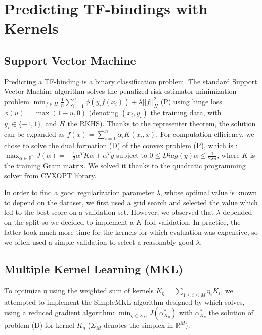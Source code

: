 \documentclass[11pt,twocolumn,letterpaper]{article}
\begin{document}
\section{Predicting TF-bindings with Kernels}

\subsection{Support Vector Machine}

Predicting a TF-binding is a binary classification problem. The standard Support Vector Machine algorithm solves the penalized risk estimator minimization problem $\min_{f \in H} \frac{1}{n} \sum_{i=1}^{n} \phi(y_i f(x_i)) + \lambda ||f||_H^2 $ (P) using hinge loss $\phi(u) = \max(1-u,0)$ (denoting $(x_i,y_i)$ the training data, with $y_i \in \{-1,1\}$, and $H$ the RKHS). Thanks to the representer theorem, the solution can be expanded as $f(x) = \sum_{i=1}^n \alpha_i K(x_i,x)$. For computation efficiency, we chose to solve the dual formation (D) of the convex problem (P), which is \cite{MVAKernels}: $\max_{\alpha \in \mathbb{R}^n} J(\alpha) = - \frac{1}{2} \alpha^T K \alpha + \alpha^T y$ subject to $0 \leq Diag(y) \alpha \leq \frac{1}{2 \lambda n}$, where $K$ is the training Gram matrix. We solved it thanks to the quadratic programming solver from CVXOPT library.

In order to find a good regularization parameter $\lambda$, whose optimal value is known to depend on the dataset, we first used a grid search and selected the value which led to the best score on a validation set. However, we observed that $\lambda$ depended on the split so we decided to implement a $K$-fold validation. In practice, the latter took much more time for the kernels for which evaluation was expensive, so we often used a simple validation to select a reasonably good $\lambda$.

\subsection{Multiple Kernel Learning (MKL)}

To optimize $\eta$ using the weighted sum of kernels $K_{\eta} = \sum_{1 \leq i \leq M} \eta_i K_i$, we attempted to implement the SimpleMKL algorithm designed by \cite{rakotomamonjy:hal-00218338} which solves, using a reduced gradient algorithm: $\min_{\eta \in \Sigma_M} J(\alpha_{K_{\eta}}^*)$ with $\alpha_{K_{\eta}}^*$ the solution of problem (D) for kernel $K_{\eta}$ ($\Sigma_M$ denotes the simplex in $\mathbb{R}^M$).
\end{document}
